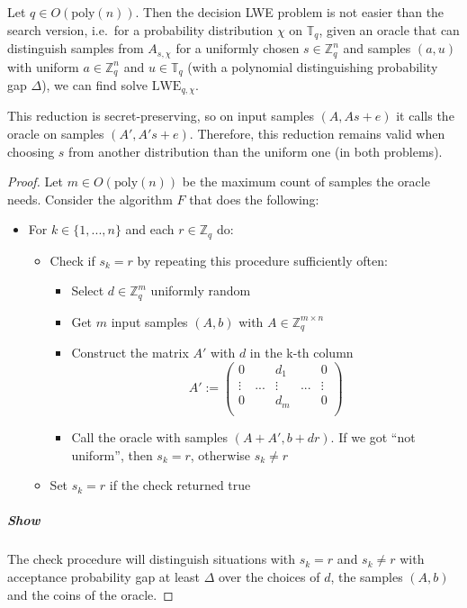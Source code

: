 \documentclass{report}
\newcommand{\T}{\mathbb{T}}
\newcommand{\Z}{\mathbb{Z}}
\begin{document}
\label{decision_to_search}
Let $q \in O(\mathrm{poly}(n))$. Then the decision LWE problem is not easier than the search version, i.e.\ for a probability distribution $\chi$ on $\T_q$, given an oracle that can distinguish samples from $A_{s, \chi}$ for a uniformly chosen $s \in \Z_q^n$ and samples $(a, u)$ with uniform $a \in \Z_q^n$ and $u \in \T_q$ (with a polynomial distinguishing probability gap $\Delta$), we can find solve $\mathrm{LWE}_{q, \chi}$.

This reduction is secret-preserving, so on input samples $(A, As + e)$ it calls the oracle on samples $(A', A's + e)$. Therefore, this reduction remains valid when choosing $s$ from another distribution than the uniform one (in both problems).

\begin{proof}
Let $m \in O(\mathrm{poly}(n))$ be the maximum count of samples the oracle needs. Consider the algorithm $F$ that does the following:
\begin{itemize}
\item For $k \in \{ 1, ..., n\}$ and each $r \in \Z_q$ do:
\begin{itemize}
\item Check if $s_k = r$ by repeating this procedure sufficiently often:
\begin{itemize}
\item Select $d \in \Z_q^m$ uniformly random
\item Get $m$ input samples $(A, b)$ with $A \in \Z_q^{m \times n}$
\item Construct the matrix $A'$ with $d$ in the k-th column
\[ A' := \begin{pmatrix}
	0 & & d_1 & & 0 \\
	\vdots & ... & \vdots & ... & \vdots \\
	0 & & d_m & & 0 \\
         \end{pmatrix} \]
\item Call the oracle with samples $(A + A', b + dr)$. If we got ``not uniform'', then $s_k = r$, otherwise $s_k \neq r$
\end{itemize}
\item Set $s_k = r$ if the check returned true
\end{itemize}
\end{itemize}
\subparagraph{Show} The check procedure will distinguish situations with $s_k = r$ and $s_k \neq r$ with acceptance probability gap at least $\Delta$ over the choices of $d$, the samples $(A, b)$ and the coins of the oracle.


\end{proof}
\end{document}
